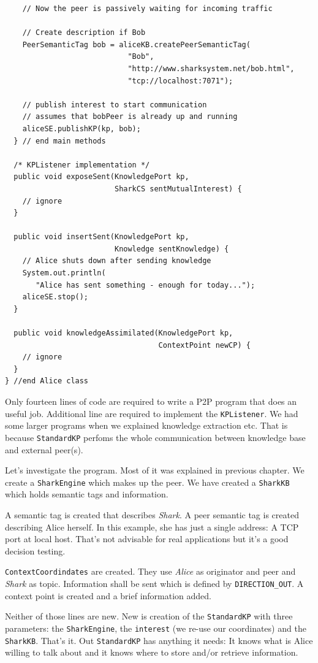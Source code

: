 \begin{verbatim}
    // Now the peer is passively waiting for incoming traffic

    // Create description if Bob
    PeerSemanticTag bob = aliceKB.createPeerSemanticTag(
                            "Bob", 
                            "http://www.sharksystem.net/bob.html", 
                            "tcp://localhost:7071");

    // publish interest to start communication
    // assumes that bobPeer is already up and running
    aliceSE.publishKP(kp, bob);
  } // end main methods

  /* KPListener implementation */
  public void exposeSent(KnowledgePort kp, 
                         SharkCS sentMutualInterest) {
    // ignore
  }

  public void insertSent(KnowledgePort kp, 
                         Knowledge sentKnowledge) {
    // Alice shuts down after sending knowledge
    System.out.println(
       "Alice has sent something - enough for today...");
    aliceSE.stop();
  }

  public void knowledgeAssimilated(KnowledgePort kp, 
                                   ContextPoint newCP) {
    // ignore
  }
} //end Alice class
\end{verbatim}

Only fourteen lines of code are required to write a P2P program that does an useful job. Additional line are required to implement the {\tt KPListener}. We had some larger programs when we explained knowledge extraction etc. That is because {\tt StandardKP} perfoms the whole communication between knowledge base and external peer(s). 

Let's investigate the program. Most of it was explained in previous chapter. We create a {\tt SharkEngine} which makes up the peer. We have created a {\tt SharkKB} which holds semantic tags and information.

A semantic tag is created that describes {\it Shark}. A peer semantic tag is created describing Alice herself. In this example, she has just a single address: A TCP port at local host. That's not advisable for real applications but it's a good decision testing.

{\tt ContextCoordindates} are created. They use {\it Alice} as originator and peer and {\it Shark} as topic. Information shall be sent which is defined by 
{\tt DIRECTION\_OUT}. A context point is created and a brief information added.

Neither of those lines are new. New is creation of the {\tt StandardKP} with three parameters: the {\tt SharkEngine}, the {\tt interest} (we re-use our coordinates) and the {\tt SharkKB}. That's it. Out {\tt StandardKP} has anything it needs: It knows what is Alice willing to talk about and it knows where to store and/or retrieve information.

